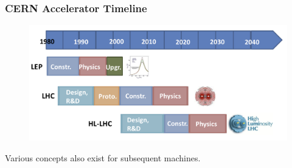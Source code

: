 \begin{frame}
\frametitle{CERN Accelerator Timeline}

\begin{figure}[htbp]
\begin{center}
\includegraphics[width=1.0\textwidth]{images/timelineCERNprojects_image_current.jpg}
\end{center}
\end{figure}

\small{Various concepts also exist for subsequent machines.}

\end{frame}


